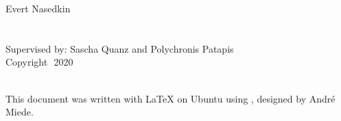 
\thispagestyle{empty}

\hfill


\begin{center}
Evert Nasedkin \\
\smallskip
\textbf{\myTitle}\\
\textit{\mySubTitle}\\
\smallskip
Supervised by: Sascha Quanz and Polychronis Patapis\\
\smallskip
Copyright\,\textcopyright\ 2020
\end{center}

\medskip

\noindent\textsf{} \\
\noindent
This document was written with \LaTeX{} on Ubuntu using \arsclassica, designed by Andr\'e Miede.

\bigskip

\noindent
\textsf{}

\noindent
{}\,